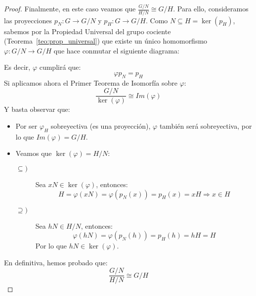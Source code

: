 \begin{teo}
\begin{proof}
        \noindent
        Finalmente, en este caso veamos que $\frac{G/N}{H/N}\cong G/H$. Para ello, consideramos las proyecciones $p_N:G\to G/N$ y $p_H:G\to G/H$. Como $N\subseteq H = \ker(p_H)$, sabemos por la Propiedad Universal del grupo cociente (Teorema~\ref{teo:prop_universal}) que existe un único homomorfismo $\varphi:G/N\to G/H$ que hace conmutar el siguiente diagrama:
        \begin{figure}[H]
            \centering
        \end{figure}
        Es decir, $\varphi$ cumplirá que:
        \begin{equation*}
            \varphi p_N = p_H
        \end{equation*}
        Si aplicamos ahora el Primer Teorema de Isomorfía sobre $\varphi$:
        \begin{equation*}
            \dfrac{G/N}{\ker(\varphi)} \cong Im(\varphi)
        \end{equation*}
        Y basta observar que:
        \begin{itemize}
            \item Por ser $\varphi_H$ sobreyectiva (es una proyección), $\varphi$ también será sobreyectiva, por lo que $Im(\varphi) = G/H$.
            \item Veamos que $\ker(\varphi) = H/N$:
                \begin{description}
                    \item [$\subseteq)$] Sea $xN\in \ker(\varphi)$, entonces:
                        \begin{equation*}
                            H = \varphi(xN) = \varphi(p_N(x)) = p_H(x) = xH \Longrightarrow x\in H
                        \end{equation*}
                    \item [$\supseteq)$] Sea $hN\in H/N$, entonces:
                        \begin{equation*}
                            \varphi(hN) = \varphi(p_N(h)) = p_H(h) = hH = H 
                        \end{equation*}
                        Por lo que $hN \in \ker(\varphi)$.
                \end{description}
        \end{itemize}
        En definitiva, hemos probado que:
        \begin{equation*}
            \dfrac{G/N}{H/N} \cong G/H
        \end{equation*}
    \end{proof}
\end{teo}

